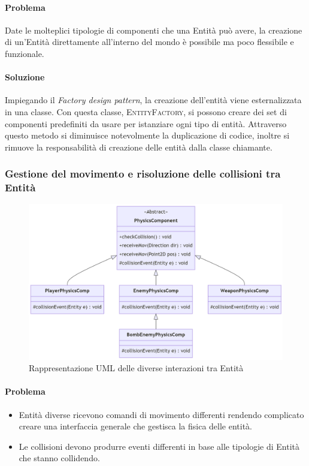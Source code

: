 \documentclass[a4paper,12pt]{report}
\begin{document}
\paragraph{Problema}
    Date le molteplici tipologie di componenti che una Entità può avere, la creazione di un'Entità direttamente all'interno del mondo è possibile ma poco flessibile e funzionale. 
    
\paragraph{Soluzione}
    Impiegando il \textit{Factory design pattern},  la creazione dell'entità viene esternalizzata in una classe. Con questa classe, \textsc{EntityFactory}, si possono creare dei set di componenti predefiniti da usare per istanziare ogni tipo di entità. Attraverso questo metodo si diminuisce notevolmente la duplicazione di codice, inoltre si rimuove la responsabilità di creazione delle entità dalla classe chiamante. 

\subsubsection{Gestione del movimento e risoluzione delle collisioni tra Entità}

\begin{figure}[H]
\centering{}
\includegraphics[width=1\textwidth,keepaspectratio]{img/PhysicsComponentUML.png}
\caption{Rappresentazione UML delle diverse interazioni tra Entità}
\end{figure}

\paragraph{Problema}
\begin{itemize}
    \item Entità diverse ricevono comandi di movimento differenti rendendo complicato creare una interfaccia generale che gestisca la fisica delle entità.
    \item Le collisioni devono produrre eventi differenti in base alle tipologie di Entità che stanno collidendo.
\end{itemize}
\end{document}
